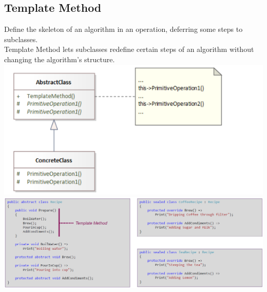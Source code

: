 \subsection{Template Method}
Define the skeleton of an algorithm in an operation, deferring some steps to subclasses.\\
Template Method lets subclasses redefine certain steps of an algorithm without changing the algorithm's structure.\\
\includegraphics[width=0.7\linewidth]{../img/template_method.png}\\
\includegraphics[width=\linewidth]{../img/template_method_code.png}



























